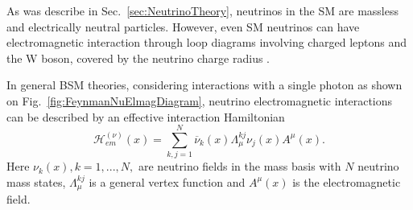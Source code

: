 
As was describe in Sec.~\ref{sec:NeutrinoTheory}, neutrinos in the \gls{SM} are massless and electrically neutral particles. However, even \gls{SM} neutrinos can have electromagnetic interaction through loop diagrams involving charged leptons and the W boson, covered by the neutrino charge radius \cite{SnowmassNeutrinoFrontierReport.pdf}.


In general \gls{BSM} theories, considering interactions with a single photon as shown on Fig.~\ref{fig:FeynmanNuElmagDiagram}, neutrino electromagnetic interactions can be described by an effective interaction Hamiltonian \cite{nuElmagInt2015.pdf}
\begin{equation}
\mathcal{H}^{\left(\nu\right)}_{em}\left(x\right)=\sum^N_{k,j=1}\overline{\nu}_k\left(x\right)\Lambda^{kj}_{\mu}\nu_j\left(x\right)A^{\mu}\left(x\right).
\end{equation}
Here $\nu_k\left(x\right), k = 1,...,N,$ are neutrino fields in the mass basis with $N$ neutrino mass states, $\Lambda^{kj}_{\mu}$ is a general vertex function and $A^{\mu}\left(x\right)$ is the electromagnetic field.

